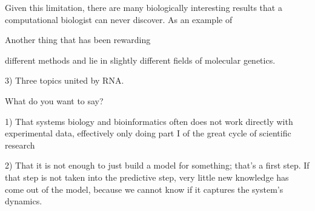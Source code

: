 Given this limitation, there are many biologically interesting results that a
computational biologist can never discover. As an example of 



Another thing that has been rewarding 

different methods and lie in slightly different fields of molecular genetics.

3) Three topics united by RNA.

What do you want to say?

1) That systems biology and bioinformatics often does not work directly with
experimental data, effectively only doing part I of the great cycle of
scientific research

2) That it is not enough to just build a model for something; that's a first
step. If that step is not taken into the predictive step, very little new
knowledge has come out of the model, because we cannot know if it captures the
system's dynamics.

